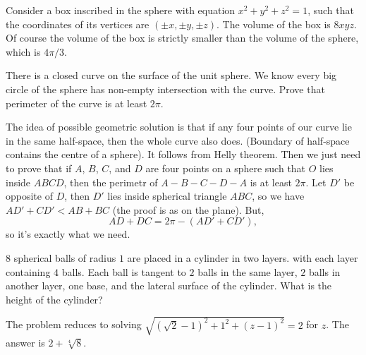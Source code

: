 \begin{solution}[name={Solution by Arne}] 
	Consider a box inscribed in the sphere with equation $x^{2}+y^{2}+z^{2}= 1$, such that the coordinates of its vertices are $\left(\pm x, \pm y, \pm z\right)$. The volume of the box is $8xyz$. Of course the volume of the box is strictly smaller than the volume of the sphere, which is $4\pi/3$.
\end{solution}




\begin{question}[name={2002 Iran TST}]
	There is a closed curve on the surface of the unit sphere. We know every big circle of the sphere has non-empty intersection with the curve. Prove that perimeter of the curve is at least $2 \pi$.
\end{question}


\begin{solution}[name={Solution by Fedor Petrov}] 
	The idea of possible geometric solution is that if any four points of our curve lie in the same half-space, then the whole curve also does. (Boundary of half-space contains the centre of a sphere). It follows from Helly theorem. Then we just need to prove that if $A$, $B$, $C$, and $D$ are four points on a sphere such that $O$ lies inside $ABCD$, then the perimetr of $A-B-C-D-A$ is at least $ 2\pi$. Let $D'$ be opposite of $D$, then $ D'$ lies inside spherical triangle $ABC$, so we have $AD'+CD'<AB+BC$ (the proof is as on the plane). But, \[AD+DC=2\pi-(AD'+CD'),\] so it's exactly what we need.
\end{solution}




\begin{question}[name={2003 China}]
	$8$ spherical balls of radius $1$ are placed in a cylinder in two layers. with each layer containing $4$ balls. Each ball is tangent to $2$ balls in the same layer, $2$ balls in another layer, one base, and the lateral surface of the cylinder. What is the height of the cylinder?
\end{question}


\begin{solution}
	The problem reduces to solving $\sqrt{(\sqrt{2}-1)^2+1^2+(z-1)^2} = 2$ for $z$. The answer is $2+\sqrt[4]{8}$.
\end{solution}




